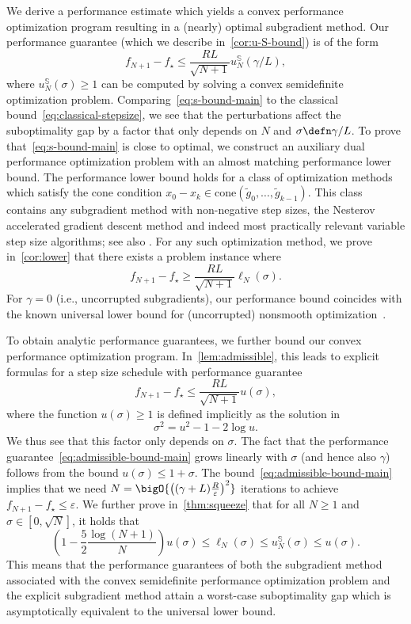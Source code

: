 \documentclass{article}
\begin{document}
We derive a performance estimate which yields a convex performance optimization program resulting in a (nearly) optimal subgradient method. Our performance guarantee (which we describe in~\cref{cor:u-S-bound}) is of the form
\begin{equation}\label{eq:s-bound-main}
f_{N+1}-f_\star\le \frac{RL}{\sqrt{N+1}}u_N^{\mathbb S}(\gamma/L),
\end{equation}
where $u_N^{\mathbb S}(\sigma)\ge1$ can be computed by solving a convex semidefinite optimization problem.
Comparing~\eqref{eq:s-bound-main} to the classical bound~\eqref{eq:classical-stepsize},
we see that the perturbations affect the suboptimality gap by a factor that only depends on $N$ and $\sigma\defn\gamma/L$.
To prove that~\eqref{eq:s-bound-main} is close to optimal, we construct an auxiliary dual performance optimization problem with an almost matching performance lower bound.
The performance lower bound holds for a class of optimization methods which satisfy the cone condition $x_0-x_k\in\text{cone}(\tilde g_0,\dots,\tilde g_{k-1})$.
This class contains any subgradient method with non-negative step sizes, the Nesterov accelerated gradient descent method and indeed most practically relevant variable step size algorithms; see also \cite{fatkhullin2025sgdhandleheavytailednoise}.
For any such optimization method, we prove in~\cref{cor:lower} that there exists a problem instance where
\[
f_{N+1}-f_\star\ge\frac{RL}{\sqrt{N+1}}\ell_N(\sigma).
\] 
For $\gamma=0$ (i.e., uncorrupted subgradients), our performance bound coincides with the known universal lower bound for (uncorrupted) nonsmooth optimization~\citep{Drori_Teboulle_2016}. 


To obtain analytic performance guarantees, we further bound our convex performance optimization program. In~\cref{lem:admissible}, this leads to explicit formulas for a step size schedule with performance guarantee
\begin{equation}\label{eq:admissible-bound-main}
f_{N+1}-f_\star\le \frac{RL}{\sqrt{N+1}}u(\sigma),
\end{equation}
where the function $u(\sigma)\ge1$ is defined implicitly as the solution in
\[
\sigma^2=u^2-1-2\log u.
\]
We thus see that this factor only depends on $\sigma$.
The fact that the performance guarantee~\eqref{eq:admissible-bound-main} grows linearly with $\sigma$ (and hence also $\gamma$) follows from the bound $u(\sigma)\le 1+\sigma$.
The bound~\eqref{eq:admissible-bound-main} implies that we need $N=\bigO{\left((\gamma+L)\frac R\varepsilon\right)^2}$
iterations to achieve $f_{N+1}-f_\star\le \varepsilon$.
We further prove in~\cref{thm:squeeze} that for all $N\ge1$ and $\sigma\in[0,\sqrt{N}]$, it holds that
\[
\left(1-\frac52\frac{\log (N+1)}{N}\right) u(\sigma)\le \ell_N(\sigma)\le u_N^{\mathbb S}(\sigma)\le u(\sigma).
\]
This means that the performance guarantees of both the subgradient method associated with the convex semidefinite performance optimization problem and the explicit subgradient method attain a worst-case suboptimality gap which is asymptotically equivalent to the universal lower bound.
\end{document}
